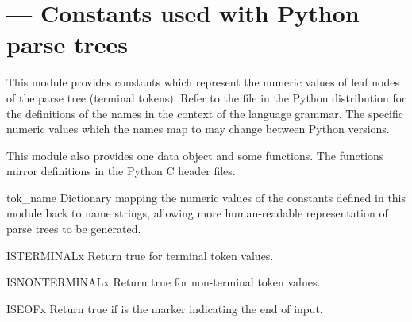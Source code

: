 \section{ ---
         Constants used with Python parse trees}



This module provides constants which represent the numeric values of
leaf nodes of the parse tree (terminal tokens).  Refer to the file
 in the Python distribution for the definitions
of the names in the context of the language grammar.  The specific
numeric values which the names map to may change between Python
versions.

This module also provides one data object and some functions.  The
functions mirror definitions in the Python C header files.



\begin{datadesc}{tok_name}
Dictionary mapping the numeric values of the constants defined in this
module back to name strings, allowing more human-readable
representation of parse trees to be generated.
\end{datadesc}

\begin{funcdesc}{ISTERMINAL}{x}
Return true for terminal token values.
\end{funcdesc}

\begin{funcdesc}{ISNONTERMINAL}{x}
Return true for non-terminal token values.
\end{funcdesc}

\begin{funcdesc}{ISEOF}{x}
Return true if  is the marker indicating the end of input.
\end{funcdesc}

\begin{seealso}
\end{seealso}
